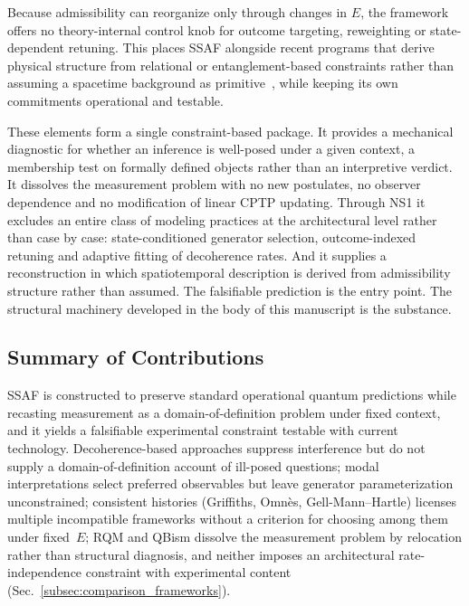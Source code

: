 \documentclass[aps,prx,onecolumn,11pt]{revtex4-2}
\theoremstyle{plain}
\theoremstyle{definition}
\theoremstyle{remark}
\begin{document}
Because admissibility can reorganize only through changes in $E$, the
framework offers no theory-internal control knob for outcome targeting,
reweighting or state-dependent retuning. This places SSAF alongside
recent programs that derive physical structure from relational or
entanglement-based constraints rather than assuming a spacetime
background as primitive~\cite{VanRaamsdonk2010}, while keeping its own
commitments operational and testable.

These elements form a single constraint-based package. It provides a
mechanical diagnostic for whether an inference is well-posed under a
given context, a membership test on formally defined objects rather than
an interpretive verdict. It dissolves the measurement problem with no
new postulates, no observer dependence and no modification of linear
CPTP updating. Through NS1 it excludes an entire class of modeling
practices at the architectural level rather than case by case:
state-conditioned generator selection, outcome-indexed retuning and
adaptive fitting of decoherence rates. And it supplies a reconstruction
in which spatiotemporal description is derived from admissibility
structure rather than assumed. The falsifiable prediction is the entry
point. The structural machinery developed in the body of this manuscript
is the substance.

\subsection{Summary of Contributions}
\label{subsec:deliverables}
SSAF is constructed to preserve standard operational quantum predictions while recasting measurement as a domain-of-definition problem under fixed context, and it yields a falsifiable experimental constraint testable with current technology. Decoherence-based approaches
suppress interference but do not supply a domain-of-definition account of
ill-posed questions; modal interpretations select preferred observables but leave
generator parameterization unconstrained; consistent histories
(Griffiths, Omn\`{e}s, Gell-Mann--Hartle) licenses multiple incompatible
frameworks without a criterion for choosing among them under fixed~$E$; RQM and
QBism dissolve the measurement problem by relocation rather than structural
diagnosis, and neither imposes an architectural rate-independence constraint with
experimental content (Sec.~\ref{subsec:comparison_frameworks}).
\end{document}
